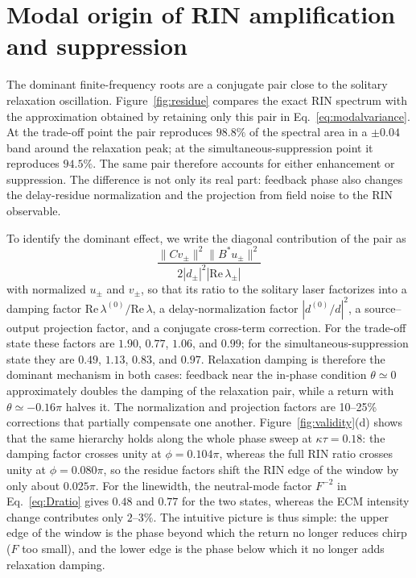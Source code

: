 \documentclass{optica-article}
\newif\ifmarked
\newenvironment{revised}{\ifmarked\color{blue}\fi}{}
\begin{document}
\section{Modal origin of RIN amplification and suppression}
\label{sec:modal}

The dominant finite-frequency roots are a conjugate pair close to the solitary relaxation oscillation. Figure~\ref{fig:residue} compares the exact RIN spectrum with the approximation obtained by retaining only this pair in Eq.~\eqref{eq:modalvariance}. At the trade-off point the pair reproduces $98.8\%$ of the spectral area in a $\pm0.04$ band around the relaxation peak; at the simultaneous-suppression point it reproduces $94.5\%$. The same pair therefore accounts for either enhancement or suppression. The difference is not only its real part: feedback phase also changes the delay-residue normalization and the projection from field noise to the RIN observable.

\begin{revised}To identify the dominant effect, we write the diagonal contribution of the pair as
\[
\frac{\|Cv_\pm\|^2\|B^*u_\pm\|^2}{2|d_\pm|^2|\mathrm{Re}\,\lambda_\pm|}
\]
with normalized $u_\pm$ and $v_\pm$, so that its ratio to the solitary laser factorizes into a damping factor $\mathrm{Re}\,\lambda^{(0)}/\mathrm{Re}\,\lambda$, a delay-normalization factor $|d^{(0)}/d|^2$, a source--output projection factor, and a conjugate cross-term correction. For the trade-off state these factors are $1.90$, $0.77$, $1.06$, and $0.99$; for the simultaneous-suppression state they are $0.49$, $1.13$, $0.83$, and $0.97$. Relaxation damping is therefore the dominant mechanism in both cases: feedback near the in-phase condition $\theta\simeq0$ approximately doubles the damping of the relaxation pair, while a return with $\theta\simeq-0.16\pi$ halves it. The normalization and projection factors are 10--25\% corrections that partially compensate one another. Figure~\ref{fig:validity}(d) shows that the same hierarchy holds along the whole phase sweep at $\kappa\tau=0.18$: the damping factor crosses unity at $\phi=0.104\pi$, whereas the full RIN ratio crosses unity at $\phi=0.080\pi$, so the residue factors shift the RIN edge of the window by only about $0.025\pi$. For the linewidth, the neutral-mode factor $F^{-2}$ in Eq.~\eqref{eq:Dratio} gives $0.48$ and $0.77$ for the two states, whereas the ECM intensity change contributes only $2$--$3\%$. The intuitive picture is thus simple: the upper edge of the window is the phase beyond which the return no longer reduces chirp ($F$ too small), and the lower edge is the phase below which it no longer adds relaxation damping.\end{revised}
\end{document}

